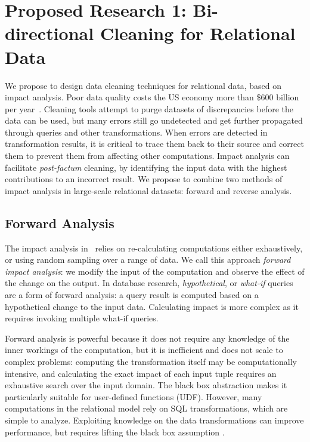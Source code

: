 \section{Proposed Research 1: Bi-directional Cleaning for Relational Data} %
\label{sec:bi_directional}

We propose to design data cleaning techniques for relational data, based on impact analysis. Poor data quality costs the US economy more than \$600 billion per year~\cite{eckerson2002}. Cleaning tools attempt to purge datasets of discrepancies before the data can be used, but many errors still go undetected and get further propagated through queries and other transformations. When errors are detected in transformation results, it is critical to trace them back to their source and correct them to prevent them from affecting other computations. Impact analysis can facilitate \emph{post-factum} cleaning, by identifying the input data with the highest contributions to an incorrect result. We propose to combine two methods of impact analysis in large-scale relational datasets: forward and reverse analysis.

\subsection{Forward Analysis} %
\label{sub:forward_analysis}
The impact analysis in \checkcell\ relies on re-calculating computations either exhaustively, or using random sampling over a range of data. We call this approach \emph{forward impact analysis}: we modify the input of the computation and observe the effect of the change on the output. 
In database research, \emph{hypothetical}, or \emph{what-if} queries \cite{DBLP:conf/vldb/BalminPP00,DBLP:conf/icde/LakshmananRS08} are a form of forward analysis: a query result is computed based on a hypothetical change to the input data.  Calculating impact is more complex as it requires invoking multiple what-if queries. 

Forward analysis is powerful because it does not require any knowledge of the inner workings of the computation, but it is inefficient and does not scale to complex problems: computing the transformation itself may be computationally intensive, and calculating the exact impact of each input tuple requires an exhaustive search over the input domain. The black box abstraction makes it particularly suitable for user-defined functions (UDF). However, many computations in the relational model rely on SQL transformations, which are simple to analyze. Exploiting knowledge on the data transformations can improve performance, but requires lifting the black box assumption .


